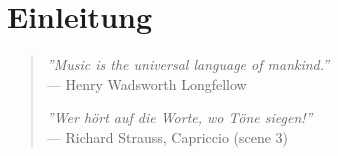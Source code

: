 \chapter{Einleitung}
\label{chap:Einleitung}

\begin{quote}
\textit{''Music is the universal language of mankind.''}
\\--- Henry Wadsworth Longfellow

\textit{''Wer hört auf die Worte, wo Töne siegen!''} 
\\--- Richard Strauss, Capriccio (scene 3)
\end{quote}


\vspace{1cm}


\nocite{*}
